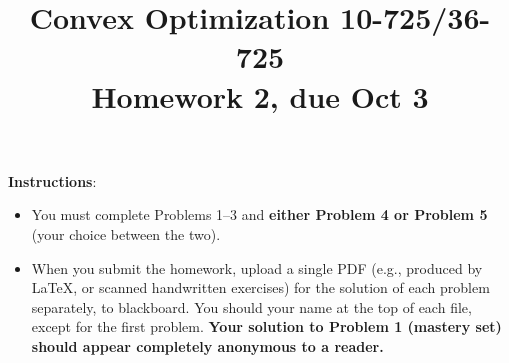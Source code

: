\documentclass[12pt]{article}
\title{Convex Optimization 10-725/36-725 \\Homework 2, due Oct 3}
\date{}
\begin{document}
\maketitle

{\bf Instructions}: 
\begin{itemize}
\item
You must complete Problems 1--3 and {\bf either
Problem 4 or Problem 5} (your choice between the two). 
\item When you
submit the homework, upload a single PDF (e.g., produced by LaTeX,
or scanned handwritten exercises) for the solution of each problem 
separately, to blackboard. You should your name at the top of each 
file, except for the first problem. {\bf Your solution to Problem 1
(mastery set) should appear completely anonymous to a reader.}
\end{itemize}






\end{document}
